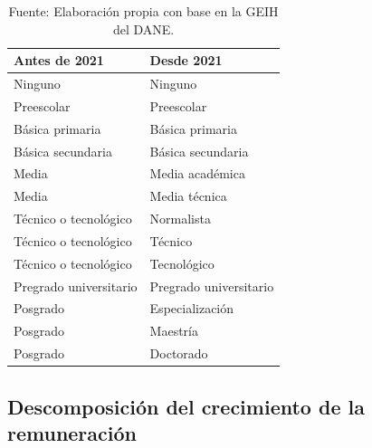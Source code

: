 \begin{table}[H]
\centering
\caption{Correspondencia entre logros educativos}
\label{tab:mapeo_logros_educativos}
\footnotesize
\setlength{\tabcolsep}{8pt}
\begin{tabular}{@{}>{\raggedright\arraybackslash}p{5.6cm}>{\raggedright\arraybackslash}p{5.6cm}@{}}
\toprule
Antes de 2021 & Desde 2021 \\
\midrule
Ninguno & Ninguno \\
Preescolar & Preescolar \\
Básica primaria & Básica primaria \\
Básica secundaria & Básica secundaria \\
Media & Media académica \\
Media & Media técnica \\
Técnico o tecnológico & Normalista \\
Técnico o tecnológico & Técnico \\
Técnico o tecnológico & Tecnológico \\
Pregrado universitario & Pregrado universitario \\
Posgrado & Especialización \\
Posgrado & Maestría \\
Posgrado & Doctorado \\
\bottomrule
\end{tabular}
\caption*{\footnotesize Fuente: Elaboración propia con base en la GEIH del DANE.}
\end{table}

\subsection{Descomposición del crecimiento de la remuneración}

